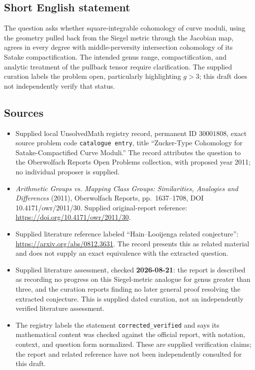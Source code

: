\documentclass[11pt]{article}
\begin{document}
\subsection{Short English statement}
The question asks whether square-integrable cohomology of curve moduli, using the geometry pulled back from the Siegel metric through the Jacobian map, agrees in every degree with middle-perversity intersection cohomology of its Satake compactification. The intended genus range, compactification, and analytic treatment of the pullback tensor require clarification. The supplied curation labels the problem open, particularly highlighting \(g>3\); this draft does not independently verify that status.
\subsection{Sources}
\begin{itemize}
\item Supplied local UnsolvedMath registry record, permanent ID \(30001808\), exact source problem code \texttt{catalogue entry}, title ``Zucker-Type Cohomology for Satake-Compactified Curve Moduli.'' The record attributes the question to the Oberwolfach Reports Open Problems collection, with proposed year 2011; no individual proposer is supplied.
\item \emph{Arithmetic Groups vs. Mapping Class Groups: Similarities, Analogies and Differences} (2011), Oberwolfach Reports, pp.\ 1637--1708, DOI 10.4171/owr/2011/30. Supplied original-report reference: \url{https://doi.org/10.4171/owr/2011/30}.
\item Supplied literature reference labeled ``Hain--Looijenga related conjecture'': \url{https://arxiv.org/abs/0812.3631}. The record presents this as related material and does not supply an exact equivalence with the extracted question.
\item Supplied literature assessment, checked \textbf{2026-08-21}: the report is described as recording no progress on this Siegel-metric analogue for genus greater than three, and the curation reports finding no later general proof resolving the extracted conjecture. This is supplied dated curation, not an independently verified literature assessment.
\item The registry labels the statement \texttt{corrected\_verified} and says its mathematical content was checked against the official report, with notation, context, and question form normalized. These are supplied verification claims; the report and related reference have not been independently consulted for this draft.
\end{itemize}
\end{document}
